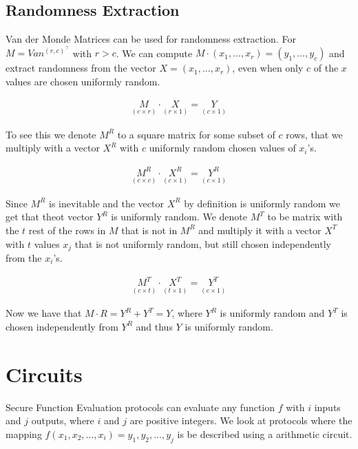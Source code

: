 \subsection{Randomness Extraction}
Van der Monde Matrices can be used for randomness extraction. For $M=Van^{(r,c)^\intercal}$ with $r>c$. We can compute $M\cdot(x_1,\dots,x_r)=(y_1,\dots,y_c)$ and extract randomness from the vector $X=(x_1,\dots,x_r)$, even when only $c$ of the $x$ values are chosen uniformly random. 

\begin{align*}
    \underset{(c \times r)}{M} \cdot \underset{(r \times 1)}{X} =
    \underset{(c \times 1)}{Y}
\end{align*}

\noindent To see this we denote $M^R$ to a square matrix for some subset of $c$ rows, that we multiply with a vector $X^R$ with $c$ uniformly random chosen values of $x_i$'s. 

\begin{align*}
    \underset{(c \times c)}{M^R} \cdot \underset{(c \times 1)}{X^R} =
    \underset{(c \times 1)}{Y^R}
\end{align*}

\noindent Since $M^R$ is inevitable and the vector $X^R$ by definition is uniformly random we get that theot vector $Y^R$ is uniformly random.
We denote $M^T$ to be matrix with the $t$ rest of the rows in $M$ that is not in $M^R$ and multiply it with a vector $X^T$ with $t$ values $x_j$ that is not uniformly random, but still chosen independently from the $x_i$'s.
    
\begin{align*}
    \underset{(c \times t)}{M^T} \cdot \underset{(t \times 1)}{X^T} =
    \underset{(c \times 1)}{Y^T}
\end{align*}

Now we have that $M \cdot R=Y^R+Y^T=Y$, where $Y^R$ is uniformly random and $Y^T$ is chosen independently from $Y^R$ and thus $Y$ is uniformly random.

\section{Circuits}
Secure Function Evaluation protocols can evaluate any function $f$ with $i$ inputs and $j$ outputs, where $i$ and $j$ are positive integers. We look at protocols where the mapping $f(x_1,x_2,...,x_i)=y_1,y_2,...,y_j$ is be described using a arithmetic circuit.

